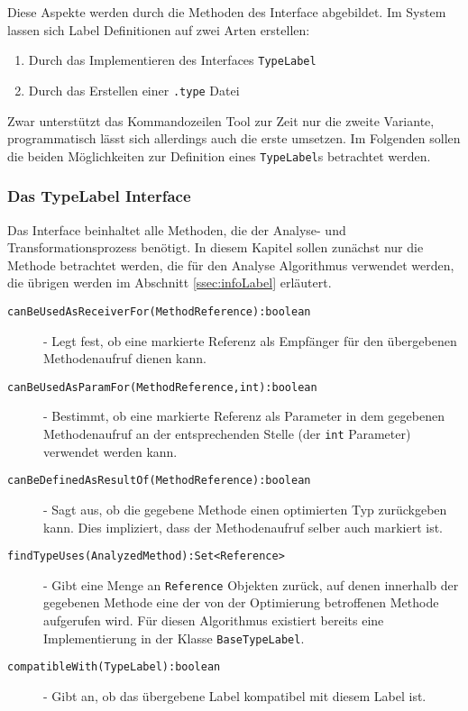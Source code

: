 Diese Aspekte werden durch die Methoden des Interface abgebildet. 
Im System lassen sich Label Definitionen auf zwei Arten erstellen:

\begin{enumerate} 
	\item Durch das Implementieren des Interfaces \texttt{TypeLabel}
	\item Durch das Erstellen einer \texttt{.type} Datei
\end{enumerate}

Zwar unterstützt das Kommandozeilen Tool zur Zeit nur die zweite Variante,
programmatisch lässt sich allerdings auch die erste umsetzen. Im 
Folgenden sollen die beiden Möglichkeiten zur Definition eines \texttt{TypeLabel}s
betrachtet werden.

\subsubsection{Das TypeLabel Interface} \label{sssec:typeLabel}

Das Interface beinhaltet alle Methoden, die der Analyse- und Transformationsprozess
benötigt. In diesem Kapitel sollen zunächst nur die Methode betrachtet werden, die
für den Analyse Algorithmus verwendet werden, die übrigen werden im Abschnitt 
\ref{ssec:infoLabel} erläutert. 

\begin{description}
	\item[\texttt{canBeUsedAsReceiverFor(MethodReference):boolean}] - Legt fest, ob eine 
	markierte Referenz als Empfänger für den übergebenen Methodenaufruf dienen kann.
	\item[\texttt{canBeUsedAsParamFor(MethodReference,int):boolean}] - Bestimmt, ob eine 
	markierte Referenz als Parameter in dem gegebenen Methodenaufruf an der 
	entsprechenden Stelle (der \texttt{int} Parameter) verwendet werden kann.
	\item[\texttt{canBeDefinedAsResultOf(MethodReference):boolean}] - Sagt aus, ob die 
	gegebene Methode einen optimierten Typ zurückgeben kann. Dies impliziert, dass
	der Methodenaufruf selber auch markiert ist.
	\item[\texttt{findTypeUses(AnalyzedMethod):Set<Reference>}] - Gibt eine Menge an \texttt{Reference}
	Objekten zurück, auf denen innerhalb der gegebenen Methode eine der von 
	der Optimierung betroffenen Methode aufgerufen wird. Für diesen Algorithmus 
	existiert bereits eine Implementierung in der Klasse \texttt{BaseTypeLabel}.
	\item[\texttt{compatibleWith(TypeLabel):boolean}] - Gibt an, ob das übergebene Label 
	kompatibel mit diesem Label ist.
\end{description}

